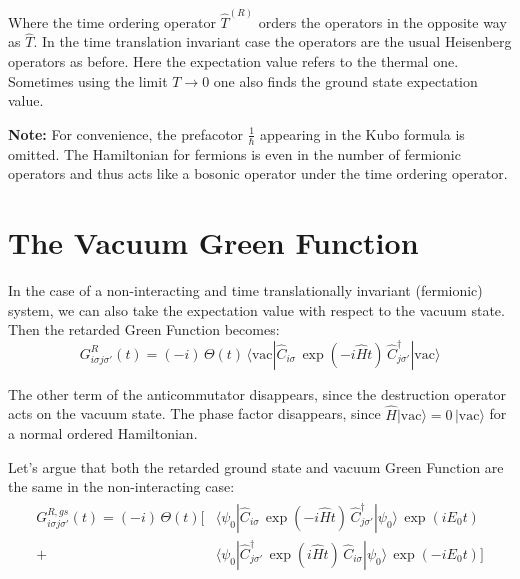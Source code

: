 Where the time ordering operator $\hat{T}^{(R)}$ orders the operators in the opposite way as $\hat{T}$.
In the time translation invariant case the operators are the usual Heisenberg operators as before.
Here the expectation value refers to the thermal one. Sometimes using the limit $T \to 0$ one also finds the ground state expectation value.

\textbf{Note:} For convenience, the prefacotor $\frac{1}{\hbar}$ appearing in the Kubo formula is omitted. \newline
The Hamiltonian for fermions is even in the number of fermionic operators and 
thus acts like a bosonic operator under the time ordering operator. 

\section{The Vacuum Green Function}
In the case of a non-interacting and time translationally invariant (fermionic) system, we can also take the expectation value with respect to the vacuum state. Then the retarded Green Function becomes:
\begin{equation}
    \boxed{\,G^{R}_{i\sigma j\sigma'}(t) = (-i)\, \Theta(t)\, \langle \text{vac} | \hat{C}_{i\sigma}\, \exp(-i\hat{H}t)\, \hat{C}_{j\sigma'}^{\dagger} | \text{vac} \rangle\,} \label{eq:vacuumGreenFunction}
\end{equation}

The other term of the anticommutator disappears, since the destruction operator acts on the vacuum state. The phase factor disappears, since $\hat{H} | \text{vac} \rangle = 0\, | \text{vac} \rangle$
for a normal ordered Hamiltonian.

Let's argue that both the retarded ground state and vacuum Green Function are the same in the non-interacting case:
\begin{align}
\begin{split}
    G^{R,gs}_{i\sigma j\sigma'}(t) = (-i)\, \Theta(t) \Big[ &\langle \psi_0 | \hat{C}_{i\sigma}\, \exp(-i\hat{H}t)\, \hat{C}_{j\sigma'}^{\dagger} | \psi_0 \rangle\, \exp(i E_0 t) \\
    + &\langle \psi_0 | \hat{C}_{j\sigma'}^{\dagger}\, \exp(i\hat{H}t)\, \hat{C}_{i\sigma} | \psi_0 \rangle\, \exp(-i E_0 t) \Big]
\end{split}
\label{eq:gs-ret-tti-gf}
\end{align}

